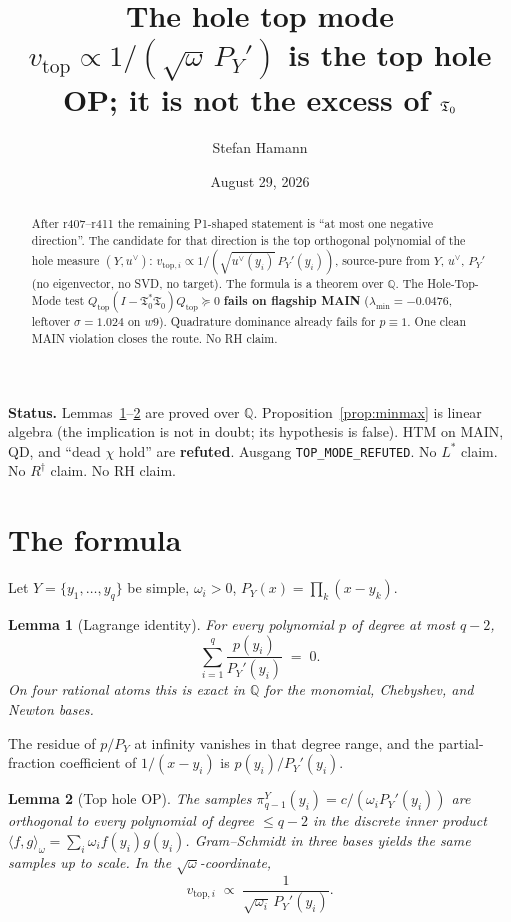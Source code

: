 \documentclass[11pt]{article}
\title{\bfseries The hole top mode\\[2mm]
\large $v_{\mathrm{top}}\propto 1/(\sqrt{\omega}\,P_Y')$ is the
top hole OP; it is not the excess of $\Tfrak_0$}
\author{Stefan Hamann}
\date{August 29, 2026}
\newtheorem{lemma}{Lemma}
\theoremstyle{remark}
\newcommand{\Tfrak}{\mathfrak{T}}
\begin{document}
\maketitle

\begin{abstract}\noindent
After r407--r411 the remaining P1-shaped statement is
``at most one negative direction''.
The candidate for that direction is the top orthogonal
polynomial of the hole measure $(Y,u^\vee)$:
$v_{\mathrm{top},i}\propto 1/(\sqrt{u^\vee(y_i)}\,P_Y'(y_i))$,
source-pure from $Y$, $u^\vee$, $P_Y'$
(no eigenvector, no SVD, no target).
The formula is a theorem over $\mathbb{Q}$.
The Hole-Top-Mode test
$Q_{\mathrm{top}}(I-\Tfrak_0^*\Tfrak_0)Q_{\mathrm{top}}\succeq 0$
\textbf{fails on flagship MAIN}
($\lambda_{\min}=-0.0476$, leftover $\sigma=1.024$ on $w9$).
Quadrature dominance already fails for $p\equiv 1$.
One clean MAIN violation closes the route.
No RH claim.
\end{abstract}

\medskip\noindent
\textbf{Status.}\enspace
Lemmas~\ref{lem:lagrange}--\ref{lem:formula} are proved over
$\mathbb{Q}$.
Proposition~\ref{prop:minmax} is linear algebra
(the implication is not in doubt; its hypothesis is false).
HTM on MAIN, QD, and ``dead $\chi$ hold'' are
\textbf{refuted}.
Ausgang \texttt{TOP\_MODE\_REFUTED}.
No $L^*$ claim.  No $R^\dagger$ claim.  No RH claim.

\section{The formula}

Let $Y=\{y_1,\dots,y_q\}$ be simple, $\omega_i>0$,
$P_Y(x)=\prod_k(x-y_k)$.

\begin{lemma}[Lagrange identity]\label{lem:lagrange}
For every polynomial $p$ of degree at most $q-2$,
\[
  \sum_{i=1}^q \frac{p(y_i)}{P_Y'(y_i)}\;=\;0.
\]
On four rational atoms this is exact in
$\mathbb{Q}$ for the monomial, Chebyshev, and Newton
bases.
\end{lemma}

The residue of $p/P_Y$ at infinity vanishes in that
degree range, and the partial-fraction coefficient of
$1/(x-y_i)$ is $p(y_i)/P_Y'(y_i)$.

\begin{lemma}[Top hole OP]\label{lem:formula}
The samples $\pi_{q-1}^Y(y_i)=c/(\omega_i P_Y'(y_i))$
are orthogonal to every polynomial of degree
$\le q-2$ in the discrete inner product
$\langle f,g\rangle_\omega=\sum_i\omega_i f(y_i)g(y_i)$.
Gram--Schmidt in three bases yields the same samples
up to scale.
In the $\sqrt{\omega}$-coordinate,
\[
  v_{\mathrm{top},i}
  \;\propto\;
  \frac{1}{\sqrt{\omega_i}\,P_Y'(y_i)}.
\]
\end{lemma}
\end{document}
